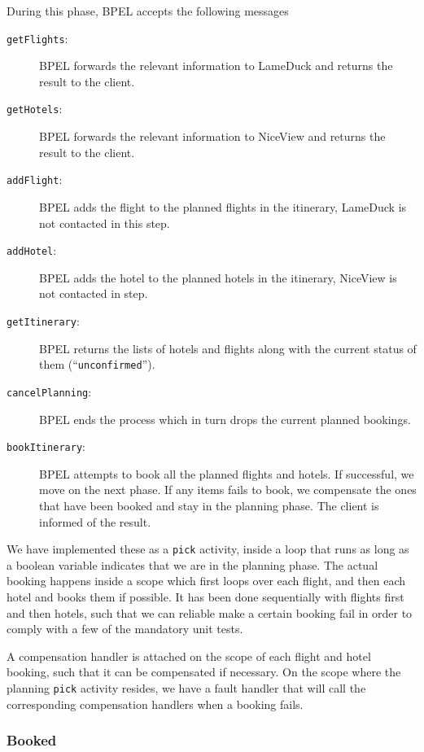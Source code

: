 \noindent
During this phase, BPEL accepts the following messages

\begin{description}
\item [\texttt{getFlights}:] BPEL forwards the relevant information to LameDuck and returns the result to the client.
\item [\texttt{getHotels}:] BPEL forwards the relevant information to NiceView and returns the result to the client.
\item [\texttt{addFlight}:] BPEL adds the flight to the planned flights in the itinerary, LameDuck is not contacted in this step.
\item [\texttt{addHotel}:] BPEL adds the hotel to the planned hotels in the itinerary, NiceView is not contacted in step.
\item [\texttt{getItinerary}:] BPEL returns the lists of hotels and flights along with the current status of them (``\texttt{unconfirmed}'').
\item [\texttt{cancelPlanning}:] BPEL ends the process which in turn drops the current planned bookings.
\item [\texttt{bookItinerary}:] BPEL attempts to book all the planned flights and hotels. If successful, we move on the next phase. If any items fails to book, we compensate the ones that have been booked and stay in the planning phase. The client is informed of the result.
\end{description}

We have implemented these as a \texttt{pick} activity, inside a loop that runs as long as a boolean variable indicates that we are in the planning phase. The actual booking happens inside a scope which first loops over each flight, and then each hotel and books them if possible. It has been done sequentially with flights first and then hotels, such that we can reliable make a certain booking fail in order to comply with a few of the mandatory unit tests. 

A compensation handler is attached on the scope of each flight and hotel booking, such that it can be compensated if necessary. On the scope where the planning \texttt{pick} activity resides, we have a fault handler that will call the corresponding compensation handlers when a booking fails.

\subsubsection{Booked}
\mkt

